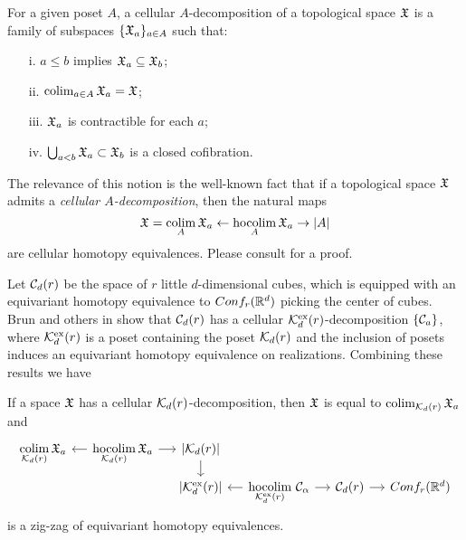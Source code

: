 \begin{definition}\label{cellulardecomposition}
	For a given poset $A$, a cellular $A$-decomposition of a topological space $\mathfrak{X}$ is a family of subspaces $\{\mathfrak{X}_a\}_{a \in A}$ such that:
	\begin{itemize}
		\item [i.] $a \leq b$ implies $\mathfrak{X}_a \subseteq \mathfrak{X}_b$;
		\item [ii.] $\operatorname*{colim}_{a \in A} \mathfrak{X}_a = \mathfrak{X}$;
		\item [iii.] $\mathfrak{X}_a$ is contractible for each $a$;
		\item [iv.] $\bigcup_{a<b} \mathfrak{X}_a \subset \mathfrak{X}_b$ is a closed cofibration.
	\end{itemize}
\end{definition}

The relevance of this notion is the well-known fact that if a topological space $\mathfrak{X}$ admits a \textit{cellular $A$-decomposition}, then the natural maps
\begin{equation}\label{e:cellular poset decomposition}
	\mathfrak{X} = \operatorname*{colim}_A \mathfrak{X}_a \leftarrow \operatorname*{hocolim}_A \mathfrak{X}_a \to \lvert A\rvert
\end{equation}
are cellular homotopy equivalences.
Please consult \cite[\S1.7]{berger1997confspacemodel} for a proof.

Let $\mathcal{C}_d(r)$ be the space of $r$ little $d$-dimensional cubes, which is equipped with an equivariant homotopy equivalence to $Conf_{r}(\mathbb{R}^{d})$ picking the center of cubes.
Brun and others in \cite{brunfiedorowiczvogt2007} show that $\mathcal{C}_d(r)$ has a cellular $\mathcal{K}^{\mathrm{ex}}_d(r)$-decomposition $\{\mathcal{C}_a\}$, where $\mathcal{K}^{\mathrm{ex}}_d(r)$ is a poset containing the poset $\mathcal{K}_d(r)$ and the inclusion of posets induces an equivariant homotopy equivalence on realizations.
Combining these results we have

\begin{proposition}\label{p:zig-zag conf}
	If a space $\mathfrak{X}$ has a cellular $\mathcal{K}_d(r)$-decomposition, then $\mathfrak{X}$ is equal to $\operatorname*{colim}_{\mathcal{K}_d(r)} \mathfrak{X}_a$ and
	\begin{equation*}
		\begin{tikzcd}[column sep=small, row sep=5]
			\displaystyle \colim_{\CG_d(r)} \fX_a & \arrow[l] \displaystyle \hocolim_{\CG_d(r)} \fX_a \arrow[r] & \bars{\CG_d(r)} \arrow[d] & & \\ & &
			\bars{\CG^\ex_d(r)} & \arrow[l] \displaystyle \hocolim_{\CG^\ex_d(r)}\,\cC_\alpha \arrow[r] & \cC_d(r) \arrow[r] & \conf{r}{d}
		\end{tikzcd}
	\end{equation*}
	is a zig-zag of equivariant homotopy equivalences.
\end{proposition}

